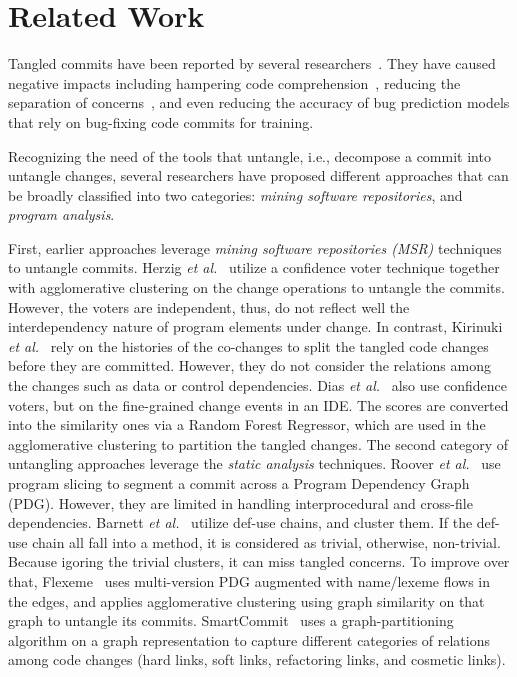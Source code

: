 \section{Related Work}
\label{related:sec}

Tangled commits have been reported by several
researchers~\cite{tao-fse12,kim-emse16,kim-msr13,hill-tse12,nguyen-issre13,flexeme-fse20,smartcommit-fse21}. They
have caused negative impacts including hampering code
comprehension~\cite{tao-fse12}, reducing the separation of
concerns~\cite{flexeme-fse20}, and even reducing the accuracy of bug
prediction models that rely on bug-fixing code commits for training.

Recognizing the need of the tools that untangle, i.e., decompose a
commit into untangle changes, several researchers have proposed
different approaches that can be broadly classified into two
categories: {\em mining software repositories}, and {\em program
  analysis}.

First, earlier approaches leverage {\em mining software repositories
  (MSR)} techniques to untangle commits. Herzig {\em et
  al.}~\cite{kim-msr13,kim-emse16} utilize a confidence voter
technique together with agglomerative clustering on the change
operations to untangle the commits.
However, the voters are independent, thus, do not reflect well the
interdependency nature of program elements under change. In contrast,
Kirinuki {\em et al.}~\cite{higo-apsec16, higo-icpc14} rely on the
histories of the co-changes to split the tangled code changes before
they are committed. However, they do not consider the relations among
the changes such as data or control dependencies. Dias {\em et
  al.}~\cite{dias-saner15} also use confidence voters, but on the
fine-grained change events in an IDE. The scores are converted into
the similarity ones via a Random Forest Regressor, which are used in
the agglomerative clustering to partition the tangled changes.  The
second category of untangling approaches leverage the {\em static
  analysis} techniques. Roover {\em et al.}~\cite{roover-scam18} use
program slicing to segment a commit across a Program Dependency Graph
(PDG).  However, they are limited in handling interprocedural and
cross-file dependencies. Barnett {\em et al.}~\cite{barnett-icse15}
utilize def-use chains, and cluster them. If the def-use chain all
fall into a method, it is considered as trivial, otherwise,
non-trivial. Because igoring the trivial clusters, it can miss tangled
concerns. To improve over that, Flexeme~\cite{flexeme-fse20} uses
multi-version PDG augmented with name/lexeme flows in the edges, and
applies agglomerative clustering using graph similarity on that graph
to untangle its commits. SmartCommit~\cite{smartcommit-fse21} uses a
graph-partitioning algorithm on a graph representation to capture
different categories of relations among code changes (hard links, soft
links, refactoring links, and cosmetic links).

